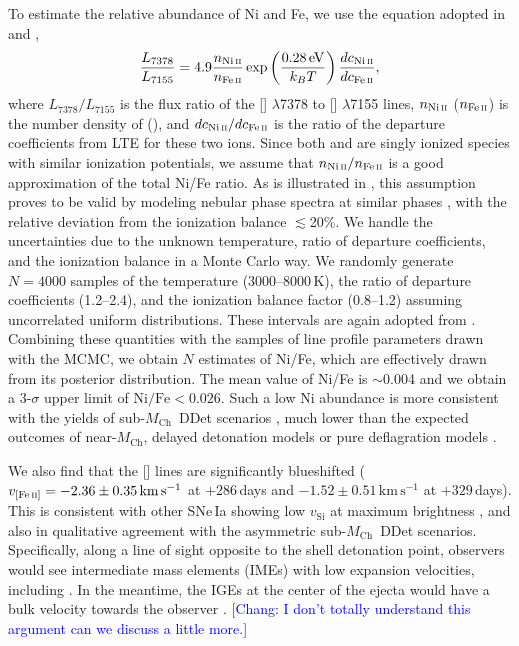 \documentclass[twocolumn]{aastex631}
\newcommand{\Mch}{$M_\mathrm{Ch}$}
\newcommand{\chang}[1]{\textcolor{blue}{[Chang: #1]}}
\begin{document}
\begin{CJK*}{UTF8}{gbsn}
To estimate the relative abundance of Ni and Fe, we use the equation adopted in \citet{Jerkstrand_2015} and \citet{Maguire_2018},
\begin{equation}
    \frac{L_{7378}}{L_{7155}} = 4.9\frac{n_{\mathrm{Ni}\,\textsc{ii}}}{n_{\mathrm{Fe}\,\textsc{ii}}}\exp\left(\frac{0.28\,\mathrm
    {eV}}{k_BT}\right)\frac{dc_{\mathrm{Ni}\,\textsc{ii}}}{dc_{\mathrm{Fe}\,\textsc{ii}}},
\end{equation}
where $L_{7378}/L_{7155}$ is the flux ratio of the [] $\lambda$7378 to [] $\lambda$7155 lines, $n_{\mathrm{Ni}\,\textsc{ii}}$ ($n_{\mathrm{Fe}\,\textsc{ii}}$) is the number density of  (), and ${dc_{\mathrm{Ni}\,\textsc{ii}}}/{dc_{\mathrm{Fe}\,\textsc{ii}}}$ is the ratio of the departure coefficients from LTE for these two ions. Since both  and  are singly ionized species with similar ionization potentials, we assume that $n_{\mathrm{Ni}\,\textsc{ii}}/n_{\mathrm{Fe}\,\textsc{ii}}$ is a good approximation of the total Ni/Fe ratio. As is illustrated in \citet{Maguire_2018}, this assumption proves to be valid by modeling nebular phase spectra at similar phases \citep{Fransson_2015,Shingles_2022}, with the relative deviation from the ionization balance $\lesssim$20\%. We handle the uncertainties due to the unknown temperature, ratio of departure coefficients, and the ionization balance in a Monte Carlo way. We randomly generate $N=4000$ samples of the temperature (3000--8000\,K), the ratio of departure coefficients (1.2--2.4), and the ionization balance factor (0.8--1.2) assuming uncorrelated uniform distributions. These intervals are again adopted from \citet{Maguire_2018}. Combining these quantities with the samples of line profile parameters drawn with the MCMC, we obtain $N$ estimates of Ni/Fe, which are effectively drawn from its posterior distribution. The mean value of Ni/Fe is $\sim$0.004 and we obtain a 3-$\sigma$ upper limit of $\mathrm{Ni/Fe}<0.026$. Such a low Ni abundance is more consistent with the yields of sub-\Mch\ DDet scenarios \citep{Shen_DD_2018}, much lower than the expected outcomes of near-\Mch, delayed detonation models \citep{Seitenzahl_2013} or pure deflagration models \citep{Iwamoto_1999}.

We also find that the [] lines are significantly blueshifted ($v_\mathrm{[Fe\,\textsc{ii}]}=-2.36\pm0.35\mathrm{\,km\,s^{-1}}$ at $+286$\,days and $-1.52\pm0.51\mathrm{\,km\,s^{-1}}$ at $+329$\,days). This is consistent with other SNe\,Ia showing low $v_\mathrm{Si}$ at maximum brightness \citep{Maeda_2010,Maguire_2018,Li_2021}, and also in qualitative agreement with the asymmetric sub-\Mch\ DDet scenarios. Specifically, along a line of sight opposite to the shell detonation point, observers would see intermediate mass elements (IMEs) with low expansion velocities, including . In the meantime, the IGEs at the center of the ejecta would have a bulk velocity towards the observer \citep{Fink_DD_2010,Bulla_2016}. \chang{I don't totally understand this argument can we discuss a little more.}


\end{CJK*}
\end{document}
